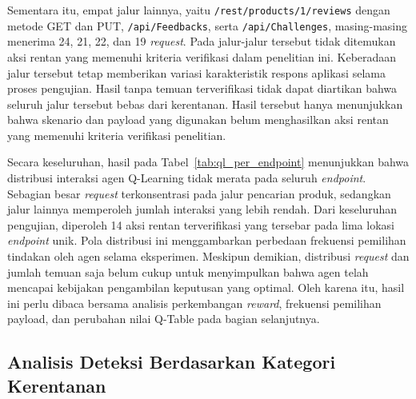 \begin{enumerate}
Sementara itu, empat jalur lainnya, yaitu \texttt{/rest/products/1/reviews} dengan metode GET dan PUT, \texttt{/api/Feedbacks}, serta \texttt{/api/Challenges}, masing-masing menerima 24, 21, 22, dan 19 \textit{request}. Pada jalur-jalur tersebut tidak ditemukan aksi rentan yang memenuhi kriteria verifikasi dalam penelitian ini. Keberadaan jalur tersebut tetap memberikan variasi karakteristik respons aplikasi selama proses pengujian. Hasil tanpa temuan terverifikasi tidak dapat diartikan bahwa seluruh jalur tersebut bebas dari kerentanan. Hasil tersebut hanya menunjukkan bahwa skenario dan payload yang digunakan belum menghasilkan aksi rentan yang memenuhi kriteria verifikasi penelitian.

Secara keseluruhan, hasil pada Tabel~\ref{tab:ql_per_endpoint} menunjukkan bahwa distribusi interaksi agen Q-Learning tidak merata pada seluruh \textit{endpoint}. Sebagian besar \textit{request} terkonsentrasi pada jalur pencarian produk, sedangkan jalur lainnya memperoleh jumlah interaksi yang lebih rendah. Dari keseluruhan pengujian, diperoleh 14 aksi rentan terverifikasi yang tersebar pada lima lokasi \textit{endpoint} unik. Pola distribusi ini menggambarkan perbedaan frekuensi pemilihan tindakan oleh agen selama eksperimen. Meskipun demikian, distribusi \textit{request} dan jumlah temuan saja belum cukup untuk menyimpulkan bahwa agen telah mencapai kebijakan pengambilan keputusan yang optimal. Oleh karena itu, hasil ini perlu dibaca bersama analisis perkembangan \textit{reward}, frekuensi pemilihan payload, dan perubahan nilai Q-Table pada bagian selanjutnya.

\subsection{Analisis Deteksi Berdasarkan Kategori Kerentanan}


\end{enumerate}

